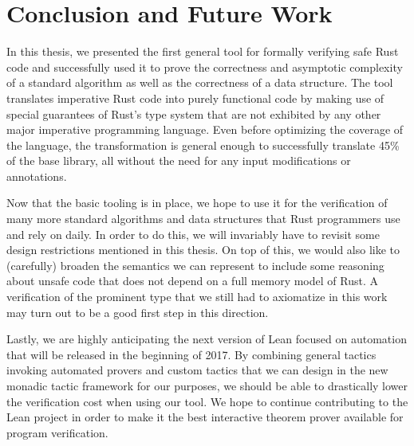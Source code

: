 \section{Conclusion and Future Work}

In this thesis, we presented the first general tool for formally verifying safe Rust code
and successfully used it to prove the correctness and asymptotic complexity of
a standard algorithm as well as the correctness of a data structure. The tool translates
imperative Rust code into purely functional code by making use of special
guarantees of Rust's type system that are not exhibited by any other major
imperative programming language. Even before optimizing the coverage of the
language, the transformation is general enough to successfully translate 45\% of
the base  library, all without the need for any input modifications or annotations.

Now that the basic tooling is in place, we hope to use it for the verification
of many more standard algorithms and data structures that Rust programmers
use and rely on daily. In order to do this, we will invariably have to revisit some
design restrictions mentioned in this thesis. On top of this, we would also
like to (carefully) broaden the semantics we can represent to include some
reasoning about unsafe code that does not depend on a full memory model of Rust.
A verification of the prominent  type that we still had to axiomatize in
this work may turn out to be a good first step in this direction.

Lastly, we are highly anticipating the next version of Lean focused on
automation that will be released in the beginning of 2017. By combining general
tactics invoking automated provers and custom tactics that we can design in the
new monadic tactic framework for our purposes, we should be able to drastically
lower the verification cost when using our tool. We hope to continue
contributing to the Lean project in order to make it the best interactive
theorem prover available for program verification.